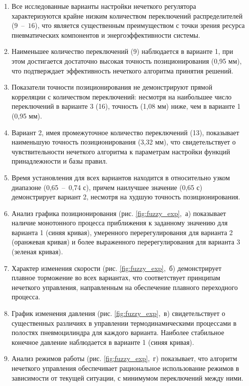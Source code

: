 \begin{enumerate}
	\item Все исследованные варианты настройки нечеткого регулятора характеризуются крайне низким количеством
	      переключений распределителей ($9$~--~$16$), что является существенным преимуществом с точки
	      зрения ресурса пневматических компонентов и энергоэффективности системы.

	\item Наименьшее количество переключений (9) наблюдается в варианте 1, при этом достигается достаточно высокая
	      точность позиционирования (0,95 мм), что подтверждает эффективность нечеткого алгоритма принятия решений.

	\item Показатели точности позиционирования не демонстрируют прямой корреляции с количеством переключений:
	      несмотря на наибольшее число переключений в варианте 3 (16), точность (1,08 мм) ниже, чем в варианте 1 (0,95 мм).

	\item Вариант 2, имея промежуточное количество переключений (13), показывает наименьшую точность
	      позиционирования (3,32 мм), что свидетельствует о чувствительности нечеткого алгоритма к параметрам
	      настройки функций принадлежности и базы правил.

	\item Время установления для всех вариантов находится в относительно узком диапазоне (0,65~--~0,74 с), причем наилучшее значение (0,65 с)
	      демонстрирует вариант 2, несмотря на худшую точность позиционирования.

	\item Анализ графика позиционирования (рис. \ref{fig:fuzzy_exp},~а) показывает наличие монотонного процесса приближения к заданному значению
	      для варианта 1 (синяя кривая), умеренного перерегулирования для варианта 2 (оранжевая кривая) и более выраженного перерегулирования для варианта 3 (зеленая кривая).

	\item Характер изменения скорости (рис. \ref{fig:fuzzy_exp},~б) демонстрирует плавное торможение во всех
	      вариантах, что соответствует принципам нечеткого управления, направленным на обеспечение плавного переходного процесса.

	\item График изменения давления (рис. \ref{fig:fuzzy_exp},~в) свидетельствует о существенных
	      различиях в управлении термодинамическими процессами в полостях пневмоцилиндра
	      для каждого варианта. Наиболее стабильное конечное давление наблюдается в варианте 1 (синяя кривая).

	\item Анализ режимов работы (рис. \ref{fig:fuzzy_exp},~г) показывает, что алгоритм нечеткого управления обеспечивает рациональное
	      использование режимов в зависимости от текущей ситуации, с минимумом переключений между ними.
\end{enumerate}

